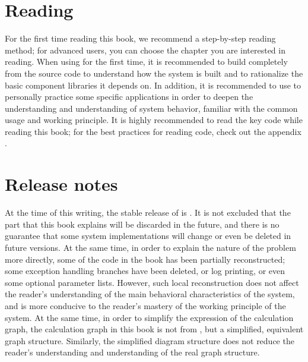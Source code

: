 \section*{Reading}
\begin{content}
For the first time reading this book, we recommend a step-by-step reading method; for advanced users, you can choose the chapter you are interested in reading. When using  for the first time, it is recommended to build  completely from the source code to understand how the system is built and to rationalize the basic component libraries it depends on.
In addition, it is recommended to use  to personally practice some specific applications in order to deepen the understanding and understanding of  system behavior, familiar with the common  usage and working principle. It is highly recommended to read the  key code while reading this book; for the best practices for reading code, check out the appendix .
\end{content}


\section*{Release notes}
\begin{content}
At the time of this writing, the stable release of  is . It is not excluded that the part  that this book explains will be discarded in the future, and there is no guarantee that some system implementations will change or even be deleted in future versions.
At the same time, in order to explain the nature of the problem more directly, some of the code in the book has been partially reconstructed; some exception handling branches have been deleted, or log printing, or even some optional parameter lists. However, such local reconstruction does not affect the reader's understanding of the main behavioral characteristics of the system, and is more conducive to the reader's mastery of the working principle of the system.
At the same time, in order to simplify the expression of the calculation graph, the calculation graph in this book is not from , but a simplified, equivalent graph structure. Similarly, the simplified diagram structure does not reduce the reader's understanding and understanding of the real graph structure.
\end{content}


